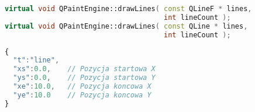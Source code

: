 \begin{lstlisting}[language=C++,numbers=none]
virtual void QPaintEngine::drawLines( const QLineF * lines, 
                                      int lineCount );
virtual void QPaintEngine::drawLines( const QLine * lines, 
                                      int lineCount );
\end{lstlisting}
\begin{lstlisting}[language=JavaScript,numbers=none]
{
  "t":"line",
  "xs":0.0,    // Pozycja startowa X
  "ys":0.0,    // Pozycja startowa Y
  "xe":10.0,   // Pozycja koncowa X
  "ye":10.0    // Pozycja koncowa Y
}
\end{lstlisting}